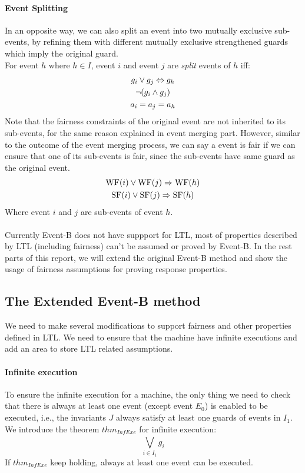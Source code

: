 \paragraph{Event Splitting}
In an opposite way, we can also split an event into two mutually exclusive sub-events, by refining them with different mutually exclusive strengthened guards which imply the original guard. \\
For event $h$ where $h \in I$, event $i$ and event $j$ are \emph{split} events of $h$ iff:
\begin{gather*} 
g_i \vee g_j \Leftrightarrow g_h\\
\neg(g_i\wedge g_j)\\
a_i = a_j = a_h
\end{gather*}
Note that the fairness constraints of the original event are not inherited to its sub-events, for the same reason explained in event merging part.
However, similar to the outcome of the event merging process, we can say a event is fair if we can ensure that one of its sub-events is fair, since the sub-events have same guard as the original event.
\begin{gather*} 
  \mathrm{WF}(i) \vee \mathrm{WF}(j) \Rightarrow  \mathrm{WF}(h)\\
  \mathrm{SF}(i) \vee \mathrm{SF}(j) \Rightarrow \mathrm{SF}(h)
\end{gather*}
Where event $i$ and $j$ are sub-events of event $h$.\\\\
Currently Event-B does not have suppport for LTL, most of properties described by LTL (including fairness) can't be assumed or proved by Event-B. In the rest parts of this report, we will extend the original Event-B method and show the usage of fairness assumptions for proving response properties.\\

\subsection{The Extended Event-B method}
We need to make several modifications to support fairness and other properties defined in LTL. We need to ensure that the machine have infinite executions and add an area to store LTL related assumptions.
\paragraph{Infinite execution}
To ensure the infinite execution for a machine, the only thing we need to check that there is always at least one event (except event $E_0$) is enabled to be executed, i.e., the invariants $J$ always satisfy at least one guards of events in $I_1$. We introduce the theorem $thm_{InfExe}$ for infinite execution:\\
\begin{displaymath}
  \bigvee_{i\in{I_1}}^{} g_i
\end{displaymath}
If $thm_{InfExe}$ keep holding, always at least one event can be executed.\\

